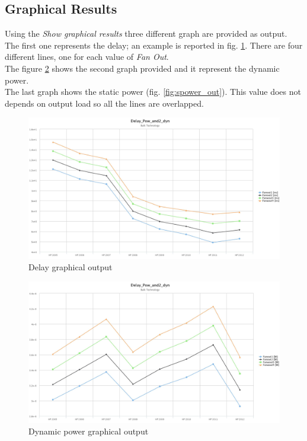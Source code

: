 \documentclass[12pt,  english, makeidx, a4paper, titlepage, oneside]{article}
\begin{document}
\subsection{Graphical Results}
Using the  \textit{Show graphical results} three different graph are provided as output. The first one represents the delay; an example is reported in fig. \ref{fig:delay_out}. There are four different lines, one for each value of \textit{Fan Out}. \\
The figure \ref{fig:dpower_out} shows the second graph provided and it represent the dynamic power.\\ The last graph shows the static power (fig. \ref{fig:spower_out}). This value does not depends on output load so all the lines are overlapped.\\
\begin{figure}[htbp]
	\begin{center}
		\includegraphics[width=17cm]{img/Delay_Pow_and2_dyn_Delay.jpeg}
		\caption{Delay graphical output}
		\label{fig:delay_out}
	\end{center}
\end{figure}

\begin{figure}[htbp]
	\begin{center}
		\includegraphics[width=17cm]{img/Delay_Pow_and2_dyn_Dpower.jpeg}
		\caption{Dynamic power graphical output}
		\label{fig:dpower_out}
	\end{center}
\end{figure}
\end{document}
